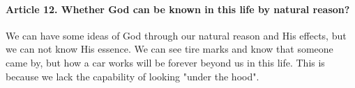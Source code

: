 \documentclass{ucetd}
\begin{document}
\paragraph{Article 12. Whether God can be known in this life by natural reason?}
We can have some ideas of God through our natural reason and His effects, but we can not know His essence. We can see tire marks and know that someone came by, but how a car works will be forever beyond us in this life. This is because we lack the capability of looking "under the hood".
\end{document}
